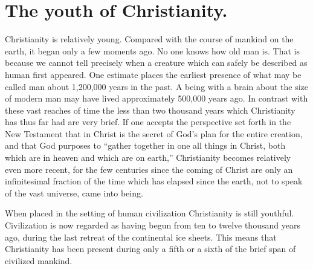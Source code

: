 \section{The youth of Christianity.}

Christianity is relatively young. Compared with the course of mankind on the earth, it began only a few moments ago. No one knows how old man is. That is because we cannot tell precisely when a creature which can safely be described as human first appeared. One estimate places the earliest presence of what may be called man about 1,200,000 years in the past. A being with a brain about the size of modern man may have lived approximately 500,000 years ago. In contrast with these vast reaches of time the less than two thousand years which Christianity has thus far had are very brief. If one accepts the perspective set forth in the New Testament that in Christ is the secret of God's plan for the entire creation, and that God purposes to ``gather together in one all things in Christ, both which are in heaven and which are on earth,'' Christianity becomes relatively even more recent, for the few centuries since the coming of Christ are only an infinitesimal fraction of the time which has elapsed since the earth, not to speak of the vast universe, came into being.

When placed in the setting of human civilization Christianity is still youthful. Civilization is now regarded as having begun from ten to twelve thousand years ago, during the last retreat of the continental ice sheets. This means that Christianity has been present during only a fifth or a sixth of the brief span of civilized mankind.

